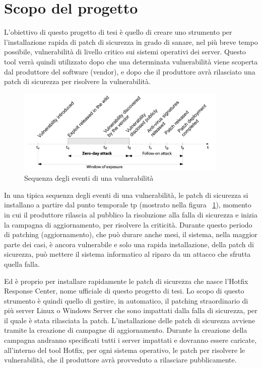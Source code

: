 \section{Scopo del progetto}
L'obiettivo di questo progetto di tesi è quello di creare uno strumento 
per l'installazione rapida di patch di sicurezza in grado di sanare, 
nel più breve tempo possibile, vulnerabilità di livello critico sui 
sistemi operativi dei server.
Questo tool verrà quindi utilizzato dopo che una determinata 
vulnerabilità viene scoperta dal produttore del software (vendor), e dopo che 
il produttore avrà rilasciato una patch di sicurezza per risolvere la 
vulnerabilità.
\begin{figure}[H]
  \begin{flushright}
    \centering
    \includegraphics[width=0.90\textwidth]{imgs/vulnerability_windows.png}
    \caption{Sequenza degli eventi di una vulnerabilità}
    \label{fig:Sequenza degli eventi di una vulnerabilità}
  \end{flushright}
\end{figure}

In una tipica sequenza degli eventi di una vulnerabilità, le patch di 
sicurezza si installano a partire dal punto temporale tp 
(mostrato nella figura ~\ref{fig:Sequenza degli eventi di una vulnerabilità}), 
momento in cui il produttore rilascia al pubblico la risoluzione alla 
falla di sicurezza e inizia la campagna di aggiornamento, per risolvere la criticità. 
Durante questo periodo di patching (aggiornamento), che può durare anche 
mesi, il sistema, nella maggior parte dei casi, è ancora vulnerabile e 
solo una rapida installazione, della patch di sicurezza, può mettere il 
sistema informatico al riparo da un attacco che sfrutta quella falla.

Ed è proprio per installare rapidamente le patch di sicurezza che nasce 
l’Hotfix Response Center, nome ufficiale di questo progetto di tesi.
Lo scopo di questo strumento è quindi quello di gestire, in automatico, 
il patching straordinario di più server Linux o Windows Server che sono 
impattati dalla falla di sicurezza, per il quale è stata rilasciata 
la patch.
L’installazione delle patch di sicurezza avviene tramite la creazione 
di campagne di aggiornamento. Durante la creazione della 
campagna andranno specificati tutti i server impattati e dovranno essere 
caricate, all’interno del tool Hotfix, per ogni sistema operativo, le 
patch per risolvere le vulnerabilità, che il produttore avrà provveduto 
a rilasciare pubblicamente.

